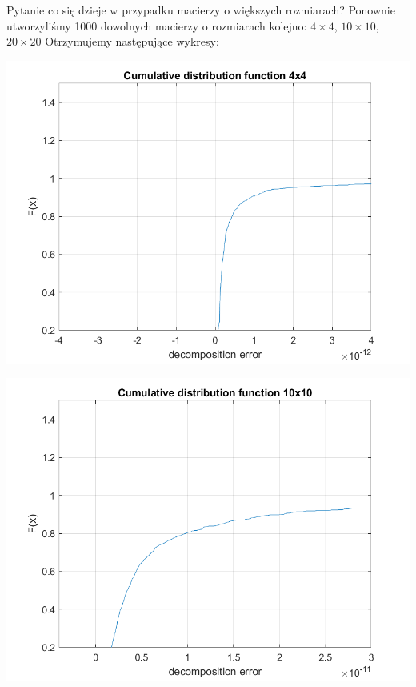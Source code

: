 \documentclass{article}\usepackage{amsmath,amsfonts,amssymb}
\begin{document}
Pytanie co się dzieje w przypadku macierzy o większych rozmiarach? Ponownie utworzyliśmy 1000 dowolnych macierzy o rozmiarach kolejno: $4 \times 4$, $10 \times 10$,$20 \times 20$
Otrzymujemy następujące wykresy:
 \begin{center}
   \includegraphics[scale=1]{4x4.png}
\end{center}
 \begin{center}
   \includegraphics[scale=1]{10x10.png}
\end{center}
\end{document}
